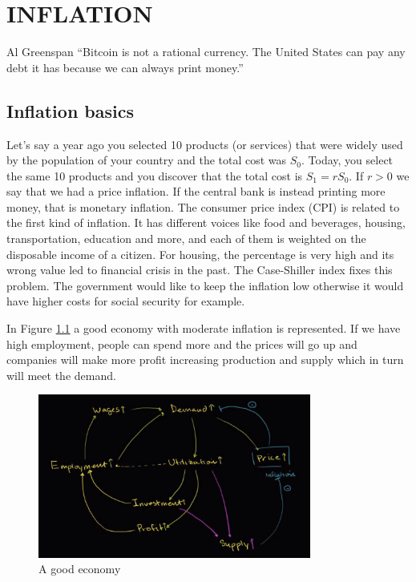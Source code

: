 \chapter{INFLATION}
\begin{chapquote}{Al Greenspan}
``Bitcoin is not a rational currency. The United States can pay any debt it has because we can always print money.''
\end{chapquote}

\section{Inflation basics}

Let's say a year ago you selected 10 products (or services) that were widely used by the population of your country and the total cost was $S_0$. Today, you select the same 10 products and you discover that the total cost is $S_1 = rS_0$. If $r > 0$ we say that we had a price inflation. If the central bank is instead printing more money, that is monetary inflation. The consumer price index (CPI) is related to the first kind of inflation. It has different voices like food and beverages, housing, transportation, education and more, and each of them is weighted on the disposable income of a citizen. For housing, the percentage is very high and its wrong value led to financial crisis in the past. The Case-Shiller index fixes this problem. The government would like to keep the inflation low otherwise it would have higher costs for social security for example.

In Figure \ref{fig:good_economy} a good economy with moderate inflation is represented. If we have high employment, people can spend more and the prices will go up and companies will make more profit increasing production and supply which in turn will meet the demand.

\begin{figure}[h!]
\centering
\includegraphics[width=0.8\textwidth]{images/good_economy.png}
\caption{A good economy}
\label{fig:good_economy}
\end{figure}

